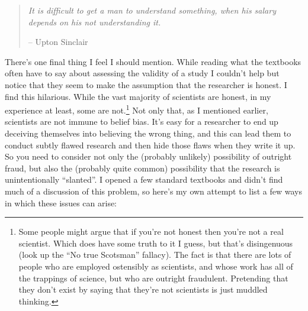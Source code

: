 \documentclass[
]{book}
\begin{document}
\begin{quote}
\emph{It is difficult to get a man to understand something, when his salary depends on his not understanding it.}

-- Upton Sinclair
\end{quote}

There's one final thing I feel I should mention. While reading what the textbooks often have to say about assessing the validity of a study I couldn't help but notice that they seem to make the assumption that the researcher is honest. I find this hilarious. While the vast majority of scientists are honest, in my experience at least, some are not.\footnote{Some people might argue that if you're not honest then you're not a real scientist. Which does have some truth to it I guess, but that's disingenuous (look up the ``No true Scotsman'' fallacy). The fact is that there are lots of people who are employed ostensibly as scientists, and whose work has all of the trappings of science, but who are outright fraudulent. Pretending that they don't exist by saying that they're not scientists is just muddled thinking.} Not only that, as I mentioned earlier, scientists are not immune to belief bias. It's easy for a researcher to end up deceiving themselves into believing the wrong thing, and this can lead them to conduct subtly flawed research and then hide those flaws when they write it up. So you need to consider not only the (probably unlikely) possibility of outright fraud, but also the (probably quite common) possibility that the research is unintentionally ``slanted''. I opened a few standard textbooks and didn't find much of a discussion of this problem, so here's my own attempt to list a few ways in which these issues can arise:
\end{document}
